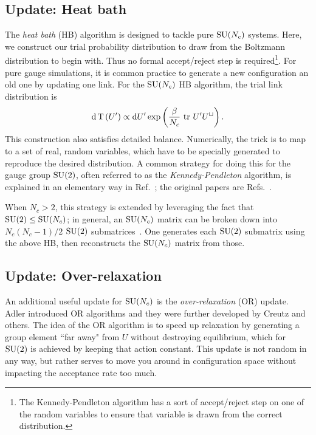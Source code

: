\subsection{Update: Heat bath}

The {\it heat bath} (HB) algorithm is designed to tackle pure $\operatorname{SU}(N_c)$
systems. Here, we construct our trial probability distribution to draw from the
Boltzmann distribution to begin with. Thus no formal accept/reject
step is required\footnote{The Kennedy-Pendleton algorithm has a sort
of accept/reject step on one of the random variables to ensure that
variable is drawn from the correct distribution.}. For pure gauge
simulations, it is common practice to generate a new configuration 
an old one by updating one link. 
For the $\operatorname{SU}(N_c)$ HB algorithm, the trial link distribution is
\begin{equation}\label{eq:PTdist}
  \dd{\operatorname{T}\left(U'\right)}\propto \dd U'\exp\left(\frac{\beta}{N_c}\,\tr\,
  U'U^\sqcup\right).
\end{equation}
This construction also satisfies detailed balance. 
Numerically, the trick is to map  to a set
of real, random variables, which have to be specially
generated to reproduce the desired distribution.
A common strategy for doing this for the gauge group $\operatorname{SU}(2)$,
often referred to as the {\it Kennedy-Pendleton} algorithm, is explained in an elementary way 
in Ref.~\cite{gattringer_quantum_2010}; the original papers are
Refs.~\cite{fabricius_heat_1984,kennedy_improved_1985}.

When $N_c>2$, this strategy is extended by leveraging the fact
that $\operatorname{SU}(2)\leq\operatorname{SU}(N_c)$; in general, an $\operatorname{SU}(N_c)$ matrix
can be broken down into $N_c(N_c-1)/2$ 
$\operatorname{SU}(2)$ submatrices~\cite{cabibbo_new_1982}. One generates each
$\operatorname{SU}(2)$ submatrix using the above HB, then reconstructs
the $\operatorname{SU}(N_c)$ matrix from those.


\subsection{Update: Over-relaxation}

An additional useful update for $\operatorname{SU}(N_c)$ is the 
{\it over-relaxation} (OR) update. 
Adler introduced OR algorithms \cite{adler_over-relaxation_1981} and 
they were further developed by Creutz \cite{creutz_overrelaxation_1987} 
and others. The idea of the OR algorithm is to speed up relaxation 
by generating a group element ``far away" from $U$ without
destroying equilibrium, which for $\operatorname{SU}(2)$ is achieved by keeping that action
constant. 
This update is not random in any way, but rather serves to move you around
in configuration space without impacting the acceptance rate too much.

